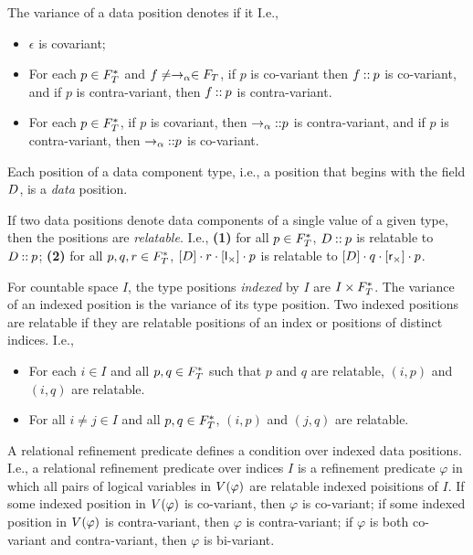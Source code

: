 The variance of a data position denotes if it
%
%
I.e.,
%
\begin{itemize}
\item %
  $\epsilon$ is covariant;
\item %
  For each $p \in F_T^{*}$ and
  $f \not= \to_{\alpha} \in F_T$, if $p$ is co-variant then
  $f \mathbin{::} p$ is co-variant, and if $p$ is contra-variant, then
  $f \mathbin{::} p$ is contra-variant.
\item %
  For each $p \in F_T^{*}$, if $p$ is covariant, then
  $\to_{\alpha} \mathbin{::} p$ is contra-variant, and if $p$ is
  contra-variant, then $\to_{\alpha} \mathbin{::} p$ is co-variant.
\end{itemize}

Each position of a data component type, i.e., a position that begins
with the field $D$, is a \emph{data} position.

If two data positions denote data components of a single value of a
given type, then the positions are \emph{relatable}.
%
I.e., %
\textbf{(1)} for all $p \in F_T^{*}$, $D \mathbin{::} p$
is relatable to $D \mathbin{::} p$; %
\textbf{(2)} for all $p, q, r \in F_T^{*}$,
$[D] \cdot r \cdot [ \mathsf{l}_{\times} ] \cdot p$ is
relatable to
$[ D ] \cdot q \cdot [ \mathsf{r}_{\times} ] \cdot p$.

For countable space $I$, the type positions \emph{indexed} by $I$ are
$I \times F_T^{*}$.
%
The variance of an indexed position is the variance of its type
position.
%
Two indexed positions are relatable if they are relatable positions of
an index or positions of distinct indices.
%
I.e.,
%
\begin{itemize}
\item %
  For each $i \in I$ and all $p, q \in F_T^{*}$ such that
  $p$ and $q$ are relatable, $(i, p)$ and $(i, q)$ are relatable.
\item %
  For all $i \not= j \in I$ and all $p, q \in F_T^{*}$,
  $(i, p)$ and $(j, q)$ are relatable.
\end{itemize}

A relational refinement predicate defines a condition over indexed
data positions.
%
I.e., a relational refinement predicate over indices $I$ is a
refinement predicate $\varphi$ in which all pairs of logical variables
in $V(\varphi)$ are relatable indexed poisitions of $I$.
%
If some indexed position in $V(\varphi)$ is co-variant, then
$\varphi$ is co-variant;
%
if some indexed position in $V(\varphi)$ is contra-variant, then
$\varphi$ is contra-variant;
%
if $\varphi$ is both co-variant and contra-variant, then $\varphi$ is
bi-variant.

